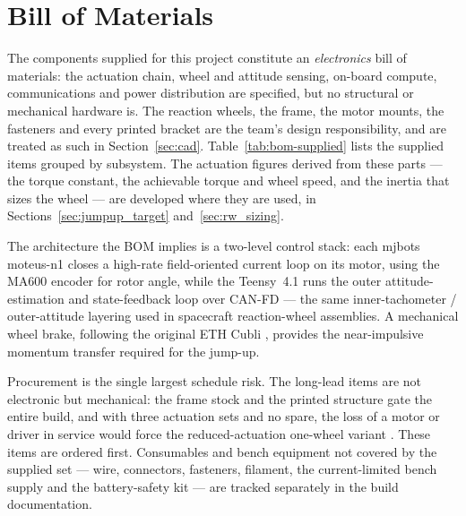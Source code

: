 \section{Bill of Materials}
\label{app:bom}

The components supplied for this project constitute an \emph{electronics} bill of
materials: the actuation chain, wheel and attitude sensing, on-board compute,
communications and power distribution are specified, but no structural or
mechanical hardware is. The reaction wheels, the frame, the motor mounts, the
fasteners and every printed bracket are the team's design responsibility, and are
treated as such in Section~\ref{sec:cad}. Table~\ref{tab:bom-supplied} lists
the supplied items grouped by subsystem. The actuation figures derived from these
parts --- the torque constant, the achievable torque and wheel speed, and the
inertia that sizes the wheel --- are developed where they are used, in
Sections~\ref{sec:jumpup_target} and~\ref{sec:rw_sizing}.

The architecture the BOM implies is a two-level control stack: each mjbots
moteus-n1 closes a high-rate field-oriented current loop on its motor, using the
MA600 encoder for rotor angle, while the Teensy~4.1 runs the outer
attitude-estimation and state-feedback loop over CAN-FD --- the same
inner-tachometer / outer-attitude layering used in spacecraft reaction-wheel
assemblies. A mechanical wheel brake, following the original ETH Cubli
\cite{gajamohan2013cubli}, provides the near-impulsive momentum transfer required
for the jump-up.

Procurement is the single largest schedule risk. The long-lead items are not
electronic but mechanical: the frame stock and the printed structure gate the
entire build, and with three actuation sets and no spare, the loss of a motor
or driver in service would force the reduced-actuation one-wheel variant
\cite{hofer2023onewheelcubli}. These items are ordered first. Consumables and
bench equipment not covered by the supplied set --- wire, connectors,
fasteners, filament, the current-limited bench supply and the battery-safety
kit --- are tracked separately in the build documentation.

